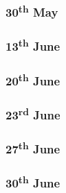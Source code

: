 \subsubsection{30\textsuperscript{th} May}     
\subsubsection{13\textsuperscript{th} June}     
\subsubsection{20\textsuperscript{th} June}     
\subsubsection{23\textsuperscript{rd} June}     
\subsubsection{27\textsuperscript{th} June}     
\subsubsection{30\textsuperscript{th} June}     
